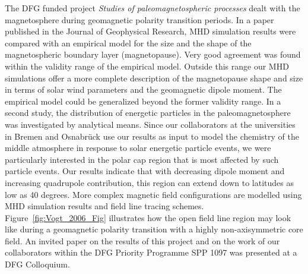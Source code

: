 The DFG funded project \emph{Studies of paleomagnetospheric processes\/}
dealt with the magnetosphere during geomagnetic polarity transition periods.
In a paper published in the Journal of Geophysical Research, MHD simulation
results were compared with an empirical model for the size and the shape
of the magnetospheric boundary layer (magnetopause).  Very good agreement
was found within the validity range of the empirical model.  Outside this
range our MHD simulations offer a more complete description of the
magnetopause shape and size in terms of solar wind parameters and the
geomagnetic dipole moment.  The empirical model could be generalized
beyond the former validity range.
In a second study, the distribution of energetic particles in the
paleomagnetosphere was investigated by analytical means.  Since our
collaborators at the universities in Bremen and Osnabr{\"u}ck use our
results as input to model the chemistry of the middle atmosphere in
response to solar energetic particle events, we were particularly
interested in the polar cap region that is most affected by such
particle events.  Our results indicate that with decreasing dipole
moment and increasing quadrupole contribution, this region can extend
down to latitudes as low as 40 degrees.
More complex magnetic field configurations are modelled using
MHD simulation results and field line tracing schemes.
Figure~\ref{fig:Vogt_2006_Fig} illustrates how the open field line
region may look like during a geomagnetic polarity transition with a
highly non-axisymmetric core field.  An invited paper on the results
of this project and on the work of our collaborators within the
DFG Priority Programme SPP 1097 was presented at a DFG Colloquium.

